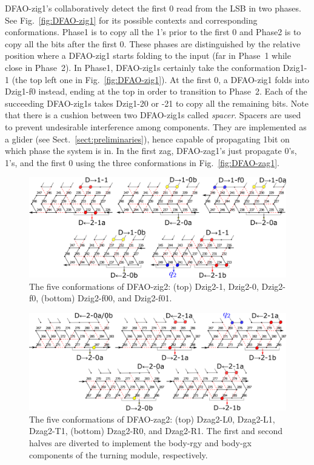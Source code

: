 DFAO-zig1's collaboratively detect the first 0 read from the LSB in two phases.
See Fig.~\ref{fig:DFAO-zig1} for its possible contexts and corresponding conformations. 
Phase1 is to copy all the 1's prior to the first 0 and Phase2 is to copy all the bits after the first 0.
These phases are distinguished by the relative position where a DFAO-zig1 starts folding to the input (far in Phase~1 while close in Phase~2).
In Phase1, DFAO-zig1s certainly take the conformation Dzig1-1 (the top left one in Fig.~\ref{fig:DFAO-zig1}).
At the first 0, a DFAO-zig1 folds into Dzig1-f0 instead, ending at the top in order to transition to Phase~2.
Each of the succeeding DFAO-zig1s takes Dzig1-20 or -21 to copy all the remaining bits. 
Note that there is a cushion between two DFAO-zig1s called \textit{spacer}.
Spacers are used to prevent undesirable interference among components.
They are implemented as a glider (see Sect.~\ref{sect:preliminaries}), hence capable of propagating 1bit on which phase the system is in.
In the first zag, DFAO-zag1's just propagate 0's, 1's, and the first 0 using the three conformations in Fig.~\ref{fig:DFAO-zag1}.



\begin{figure}[h]
\includegraphics[width=\linewidth]{pic/DFAO-zig2.png}
  \caption{The five conformations of DFAO-zig2: (top) Dzig2-1, Dzig2-0, Dzig2-f0, (bottom) Dzig2-f00, and Dzig2-f01. }
  \label{fig:DFAO-zig2}
\end{figure} 

\begin{figure}[h]
\includegraphics[width=\linewidth]{pic/DFAO-zag2.png}
\caption{The five conformations of DFAO-zag2: (top) Dzag2-L0, Dzag2-L1, Dzag2-T1, (bottom) Dzag2-R0, and Dzag2-R1.
The first and second halves are diverted to implement the body-rgy and body-gx components of the turning module, respectively. 
}
\label{fig:DFAO-zag2}
  \end{figure} 

